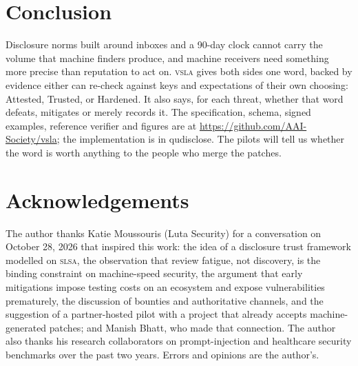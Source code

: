 \documentclass[11pt]{article}
\newcommand{\vsla}{\textsc{vsla}}
\newcommand{\slsa}{\textsc{slsa}}
\begin{document}
\section{Conclusion}

Disclosure norms built around inboxes and a 90-day clock cannot carry the volume that machine finders
produce, and machine receivers need something more precise than reputation to act on. \vsla{} gives both sides
one word, backed by evidence either can re-check against keys and expectations of their own choosing:
Attested, Trusted, or Hardened. It also says, for each threat, whether that word defeats, mitigates or merely
records it. The specification, schema, signed examples, reference verifier and figures are at \url{https://github.com/AAI-Society/vsla}; the implementation is in qudisclose.
The pilots will tell us whether the word is worth anything to the people who merge the patches.

\section*{Acknowledgements}
The author thanks Katie Moussouris (Luta Security) for a conversation on October 28, 2026 that inspired this
work: the idea of a disclosure trust framework modelled on \slsa{}, the observation that review fatigue, not
discovery, is the binding constraint on machine-speed security, the argument that early mitigations impose
testing costs on an ecosystem and expose vulnerabilities prematurely, the discussion of bounties and
authoritative channels, and the suggestion of a partner-hosted pilot with a project that already accepts
machine-generated patches; and Manish Bhatt, who made that connection. The author also thanks his research
collaborators on prompt-injection and healthcare security benchmarks over the past two years. Errors and
opinions are the author's.
\end{document}
